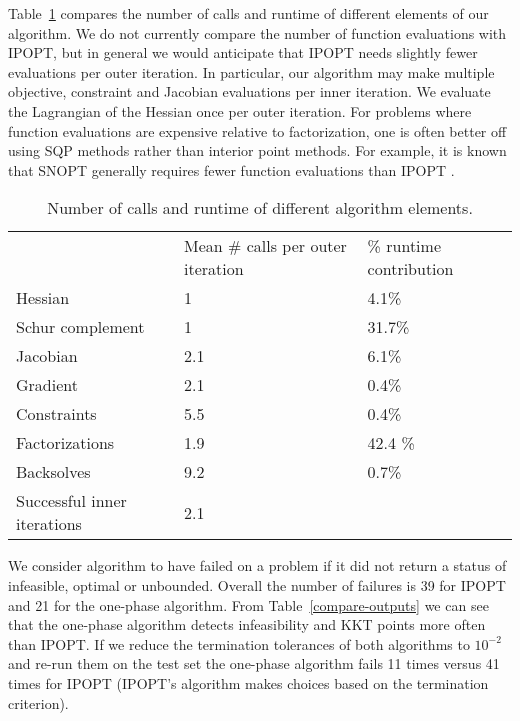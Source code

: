 \documentclass{article}
\begin{document}
Table~\ref{avg:evaluations} compares the number of calls and runtime of different elements of our algorithm. We do not currently compare the number of function evaluations with IPOPT, but in general we would anticipate that IPOPT needs slightly fewer evaluations per outer iteration. In particular, our algorithm may make multiple objective, constraint and Jacobian evaluations per inner iteration. We evaluate the Lagrangian of the Hessian once per outer iteration. For problems where function evaluations are expensive relative to factorization, one is often better off using SQP methods rather than interior point methods. For example, it is known that SNOPT generally requires fewer function evaluations than IPOPT \cite[Figure 2, Figure 3]{gill2015performance}. 

\begin{table}[H]
\begin{tabular}{l  p{3.0cm} l}
&   Mean \# calls per outer iteration & \% runtime contribution \\ 
Hessian & 1 & 4.1\% \\  
Schur complement &1 & 31.7\% \\
Jacobian & 2.1 & 6.1\%  \\
Gradient & 2.1 & 0.4\%  \\
Constraints & 5.5 & 0.4\% \\
Factorizations & 1.9  & 42.4 \%  \\
Backsolves & 9.2 & 0.7\% \\
Successful inner iterations & 2.1 & \\
\end{tabular}
\caption{Number of calls and runtime of different algorithm elements.}\label{avg:evaluations}
\end{table}


We consider algorithm to have failed on a problem if it did not return a status of infeasible, optimal or unbounded. Overall the number of failures is 39 for IPOPT and 21 for the one-phase algorithm. From Table~\ref{compare-outputs} we can see that the one-phase algorithm detects infeasibility and KKT points more often than IPOPT. If we reduce the termination tolerances of both algorithms to $10^{-2}$ and re-run them on the test set the one-phase algorithm fails 11 times versus 41 times for IPOPT (IPOPT's algorithm makes choices based on the termination criterion).
\end{document}
